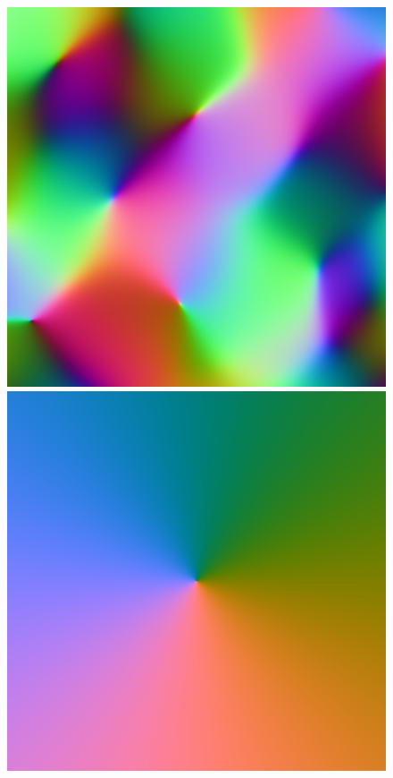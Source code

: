 \documentclass[a4paper]{article}
\begin{document}
\begin{figure}[H]
\center
\begin{minipage}[]{0.19\textwidth}
\includegraphics[width=\textwidth]{share/Noise.png}
\end{minipage}
\begin{minipage}[]{0.19\textwidth}
\includegraphics[width=\textwidth]{share/Background.png}

\end{minipage}
\end{figure}
\end{document}
